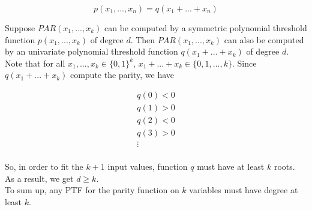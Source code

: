\documentclass[12pt]{article}
\begin{document}
\begin{equation*}
p(x_1,...,x_n) = q(x_1 + ... + x_n)
\end{equation*}

Suppose $PAR(x_1,  ..., x_k)$ can be computed by a symmetric
polynomial threshold function $p(x_1,  ..., x_k)$ of degree $d$. Then
$PAR(x_1,  ..., x_k)$ can also be computed by an univariate polynomial
threshold function $q(x_1 + ... + x_k)$ of degree $d$. \\

Note that for all $x_1, ..., x_k \in \{0,1\}^k$, $x_1 + ... + x_k \in
\{0, 1, ..., k\}$. Since $q(x_1 + ... + x_k)$ compute the parity, we
have

\begin{eqnarray*}
q(0) < 0 \\
q(1) > 0 \\
q(2) < 0 \\
q(3) > 0 \\
\vdots \\
\end{eqnarray*}

So, in order to fit the $k+1$ input values, function $q$ must have at
least $k$ roots. As a result, we get $d \ge k$. \\

To sum up, any PTF for the parity function on $k$ variables must have
degree at least $k$.
\end{document}
